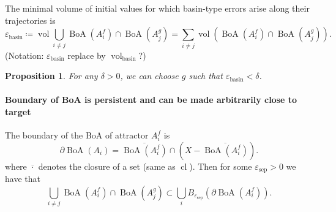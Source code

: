 \documentclass{article}
\newcommand{\ascomment}[1]{\textcolor{ascolor}{(#1)}}
\newtheorem{proposition}{Proposition}
\theoremstyle{definition} \newtheorem{definition}{Definition}
\theoremstyle{remark} \newtheorem{remark}{Remark}
\newcommand{\cl}{\operatorname{cl}}
\newcommand{\vol}{\operatorname{vol}}
\newcommand{\boa}{\operatorname{BoA}}
\newcounter{ct}
\begin{document}
The minimal volume of initial values for which basin-type errors arise along their trajectories is 
\[\varepsilon_{\operatorname{basin}} \coloneqq \vol \bigcup_{i \neq j}\boa(A_i^f)\cap\boa(A_j^g) = \sum_{i \neq j} \vol\left(\boa(A_i^f)\cap\boa(A_j^g)\right).\] %
\ascomment{Notation: $\varepsilon_{\operatorname{basin}}$ replace by $\operatorname{vol}_{\operatorname{basin}}$?}

\begin{proposition}\label{prop:min_sep_bound}
For any $\delta>0$, we can choose $g$ such that $\varepsilon_{\operatorname{basin}}<\delta$.
\end{proposition}


\paragraph{Boundary of BoA is persistent and can be made arbitrarily close to target}%
The boundary of the BoA of attractor $A_i^f$ is %
\[\partial\boa(A_i) = \overline{\boa(A_i^f)} \cap (X - \overline{\boa(A_i^f)}).\]
where \(\overline{\cdot}\) denotes the closure of a set (same as \(\cl\)). %
%
Then for some  $\varepsilon_{\operatorname{sep}}>0$ we have that 
\begin{equation}\label{eq:separatrixoverlap}
\bigcup_{i\neq j} \boa(A_i^f)\cap\boa(A_j^g) \subset \bigcup_i B_{\varepsilon_{\operatorname{sep}}}(\partial\boa(A_i^f)). 
\end{equation}

\end{document}
